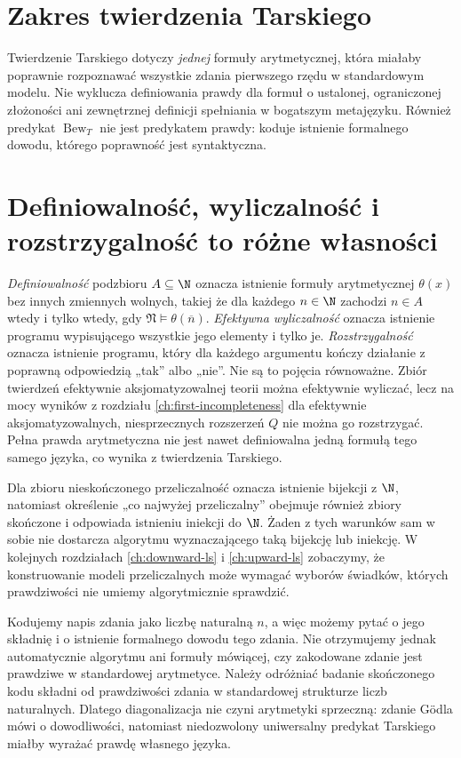 \section{Zakres twierdzenia Tarskiego}
Twierdzenie Tarskiego dotyczy \emph{jednej} formuły arytmetycznej,
która miałaby poprawnie rozpoznawać wszystkie zdania pierwszego
rzędu w standardowym modelu. Nie wyklucza definiowania prawdy
dla formuł o ustalonej, ograniczonej złożoności ani zewnętrznej
definicji spełniania w bogatszym metajęzyku. Również predykat
$\operatorname{Bew}_T$ nie jest predykatem prawdy: koduje istnienie
formalnego dowodu, którego poprawność jest syntaktyczna.

\section{Definiowalność, wyliczalność i rozstrzygalność to różne własności}
\begin{uwaga}
\emph{Definiowalność} podzbioru $A\subseteq\N$
oznacza istnienie formuły arytmetycznej $\theta(x)$
bez innych zmiennych wolnych, takiej że dla każdego $n\in\N$
zachodzi $n\in A$ wtedy i tylko wtedy, gdy
$\mathfrak N\models\theta(\overline n)$. \emph{Efektywna wyliczalność}
oznacza istnienie programu wypisującego wszystkie jego elementy i tylko je.
\emph{Rozstrzygalność} oznacza istnienie programu, który dla każdego
argumentu kończy działanie z poprawną odpowiedzią „tak” albo „nie”.
Nie są to pojęcia równoważne. Zbiór twierdzeń efektywnie aksjomatyzowalnej
teorii można efektywnie wyliczać, lecz na mocy wyników z rozdziału
\ref{ch:first-incompleteness} dla efektywnie aksjomatyzowalnych, niesprzecznych
rozszerzeń $Q$ nie można go rozstrzygać.
Pełna prawda arytmetyczna nie jest nawet definiowalna jedną formułą
tego samego języka, co wynika z twierdzenia Tarskiego.

Dla zbioru nieskończonego przeliczalność oznacza istnienie
bijekcji z $\N$, natomiast określenie „co najwyżej przeliczalny”
obejmuje również zbiory skończone i odpowiada istnieniu
iniekcji do $\N$. Żaden z tych warunków sam w sobie
nie dostarcza algorytmu wyznaczającego taką bijekcję lub iniekcję. W kolejnych rozdziałach
\ref{ch:downward-ls} i \ref{ch:upward-ls} zobaczymy,
że konstruowanie modeli przeliczalnych może wymagać wyborów
świadków, których prawdziwości nie umiemy algorytmicznie sprawdzić.
\end{uwaga}

\begin{przyklad}
Kodujemy napis zdania jako liczbę naturalną $n$,
a więc możemy pytać o jego składnię i o istnienie formalnego
dowodu tego zdania. Nie otrzymujemy jednak automatycznie
algorytmu ani formuły mówiącej, czy zakodowane zdanie
jest prawdziwe w standardowej arytmetyce.
Należy odróżniać badanie skończonego kodu składni
od prawdziwości zdania w standardowej strukturze liczb naturalnych.
Dlatego diagonalizacja nie czyni arytmetyki sprzeczną:
zdanie Gödla mówi o dowodliwości, natomiast
niedozwolony uniwersalny predykat Tarskiego miałby
wyrażać prawdę własnego języka.
\end{przyklad}